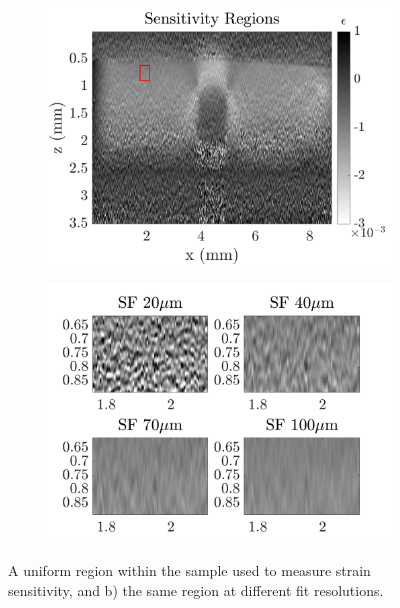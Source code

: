 \begin{figure}	
	\centering
	\begin{subfigure}{0.49\textwidth}
		\centering
		\includegraphics[width=\textwidth]{strainreview_figs/sensitivity_regions.png}
	\end{subfigure}
	\begin{subfigure}{0.49\textwidth}
		\centering
		\includegraphics[width=\textwidth]{strainreview_figs/regions_zoomed.png}
	\end{subfigure}
	\caption{A uniform region within the sample used to measure strain sensitivity, and b) the same region at different fit resolutions.}
	\label{sensivity_region}
\end{figure}


